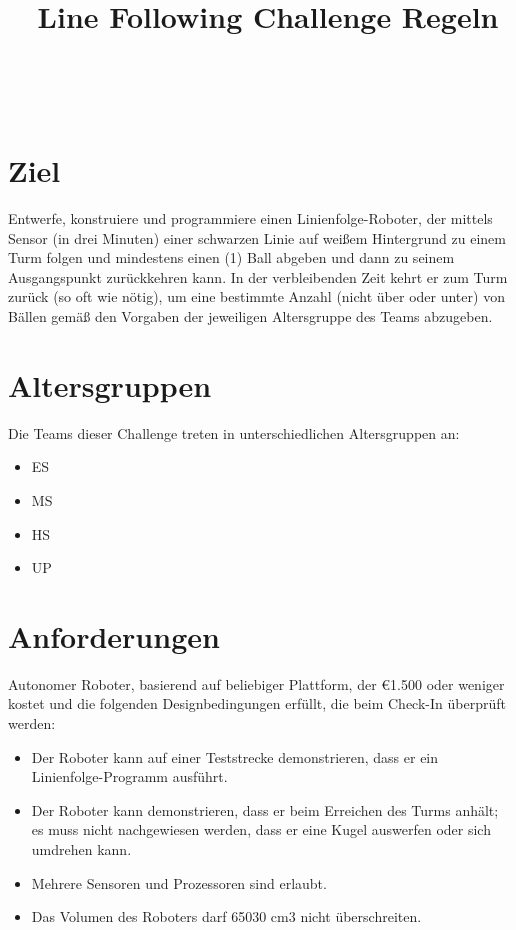 \documentclass[a4paper,12pt]{article}
\begin{document}


\title{\tagYear\ Line Following Challenge Regeln}
\makeatletter
\let\inserttitle\@title
\makeatother
\begin{center}
	\rrgerLogo
	\huge                      %
	\bfseries                   %
	\\
	\inserttitle
\end{center}

\section{Ziel}
Entwerfe, konstruiere und programmiere einen Linienfolge-Roboter, der mittels
Sensor (in drei Minuten) einer schwarzen Linie auf weißem Hintergrund zu einem
Turm folgen und mindestens einen (1) Ball abgeben und dann zu seinem
Ausgangspunkt zurückkehren kann. In der verbleibenden Zeit kehrt er zum Turm
zurück (so oft wie nötig), um eine bestimmte Anzahl (nicht über oder unter) von
Bällen gemäß den Vorgaben der jeweiligen Altersgruppe des Teams abzugeben.

\section{Altersgruppen}

Die Teams dieser Challenge treten in unterschiedlichen Altersgruppen an:
\begin{itemize}
	\item ES
	\item MS
	\item HS
	\item UP
\end{itemize}

\section{Anforderungen}
Autonomer Roboter, basierend auf beliebiger Plattform, der \euro{1.500}  oder
weniger kostet und die folgenden Designbedingungen erfüllt, die beim Check-In
überprüft werden:
\begin{itemize}
	\item Der Roboter kann auf einer Teststrecke demonstrieren, dass er
		ein Linienfolge-Programm ausführt.
	\item Der Roboter kann demonstrieren, dass er beim Erreichen des Turms
		anhält; es muss nicht nachgewiesen werden, dass er eine Kugel
		auswerfen oder sich umdrehen kann.
	\item Mehrere Sensoren und Prozessoren sind erlaubt.
	\item Das Volumen des Roboters darf 65030 cm3 nicht überschreiten.
\end{itemize}
\end{document}
